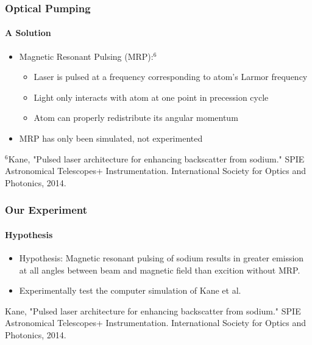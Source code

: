 \documentclass{beamer}
\begin{document}
\begin{frame}
  \frametitle{Optical Pumping}
  \framesubtitle{A Solution}
  \begin{itemize}
	\item Magnetic Resonant Pulsing (MRP):$^6$\\
	  \begin{itemize}
		\item Laser is pulsed at a frequency corresponding to atom's Larmor frequency\\
		\item Light only interacts with atom at one point in precession cycle\\
		\item Atom can properly redistribute its angular momentum\\
	  \end{itemize}
	\item MRP has only been simulated, not experimented\\
  \end{itemize}
  \bigskip
{\tiny $^6$Kane, "Pulsed laser architecture for enhancing backscatter from sodium." SPIE Astronomical Telescopes+ Instrumentation. International Society for Optics and Photonics, 2014.}\\
\end{frame}







\begin{frame}
  \frametitle{Our Experiment}
  \framesubtitle{Hypothesis}
  \begin{itemize}
	\item Hypothesis: Magnetic resonant pulsing of sodium results in greater emission at all angles between beam and magnetic field than excition without MRP.\\
	\item Experimentally test the computer simulation of Kane et al.
  \end{itemize}
  \begin{center}
\end{center}
{\tiny Kane, "Pulsed laser architecture for enhancing backscatter from sodium." SPIE Astronomical Telescopes+ Instrumentation. International Society for Optics and Photonics, 2014.}\\
\end{frame}
\end{document}
